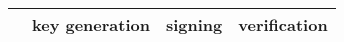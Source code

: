 \begin{table}
    \centering
    \def\arraystretch{1.2}
    \setlength\tabcolsep{0.3cm}
    \begin{tabularx}{\textwidth}{Xrrr}
        \hline
         & key generation & signing & verification \\
        \hline


\end{tabularx}
\end{table}
